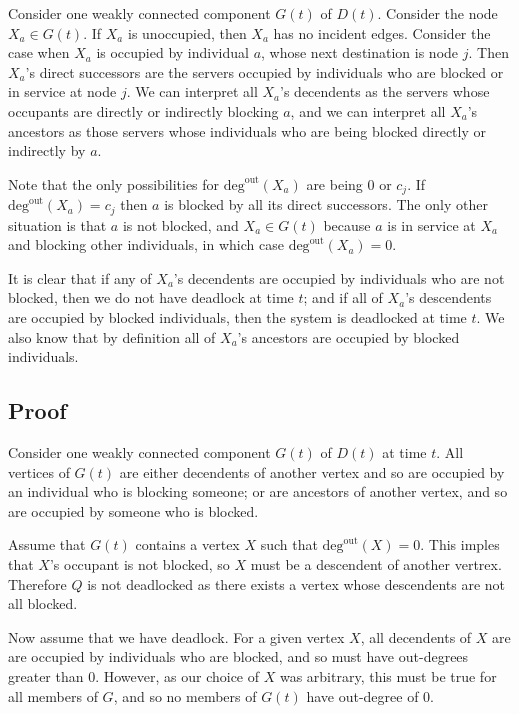 \documentclass{article}
\begin{document}
Consider one weakly connected component $G(t)$ of $D(t)$.
Consider the node $X_a \in G(t)$. If $X_a$ is unoccupied, then $X_a$ has no incident edges.
Consider the case when $X_a$ is occupied by individual $a$, whose next destination is node $j$.
Then $X_a$'s direct successors are the  servers occupied by individuals who are blocked or in service at node $j$.
We can interpret all $X_a$'s decendents as the servers whose occupants are directly or indirectly blocking $a$, and we can interpret all $X_a$'s ancestors as those servers whose individuals who are being blocked directly or indirectly by $a$.\newline

Note that the only possibilities for $\text{deg}^{\text{out}}(X_a)$ are being 0 or $c_j$.
If $\text{deg}^{\text{out}}(X_a) = c_j$ then $a$ is blocked by all its direct successors.
The only other situation is that $a$ is not blocked, and $X_a \in G(t)$ because $a$ is in service at $X_a$ and blocking other individuals, in which case $\text{deg}^{\text{out}}(X_a) = 0$.\newline

It is clear that if any of $X_a$'s decendents are occupied by individuals who are not blocked, then we do not have deadlock at time $t$; and if all of $X_a$'s descendents are occupied by blocked individuals, then the system is deadlocked at time $t$.
We also know that by definition all of $X_a$'s ancestors are occupied by blocked individuals.\newline

\subsection*{Proof}

Consider one weakly connected component $G(t)$ of $D(t)$ at time $t$.
All vertices of $G(t)$ are either decendents of another vertex and so are occupied by an individual who is blocking someone; or are ancestors of another vertex, and so are occupied by someone who is blocked.\newline

Assume that $G(t)$ contains a vertex $X$ such that $\text{deg}^{\text{out}}(X) = 0$.
This imples that $X$'s occupant is not blocked, so $X$ must be a descendent of another vertrex.
Therefore $Q$ is not deadlocked as there exists a vertex whose descendents are not all blocked.\newline

Now assume that we have deadlock.
For a given vertex $X$, all decendents of $X$ are are occupied by individuals who are blocked, and so must have out-degrees greater than 0.
However, as our choice of $X$ was arbitrary, this must be true for all members of $G$, and so no members of $G(t)$ have out-degree of 0.\newline



\end{document}
